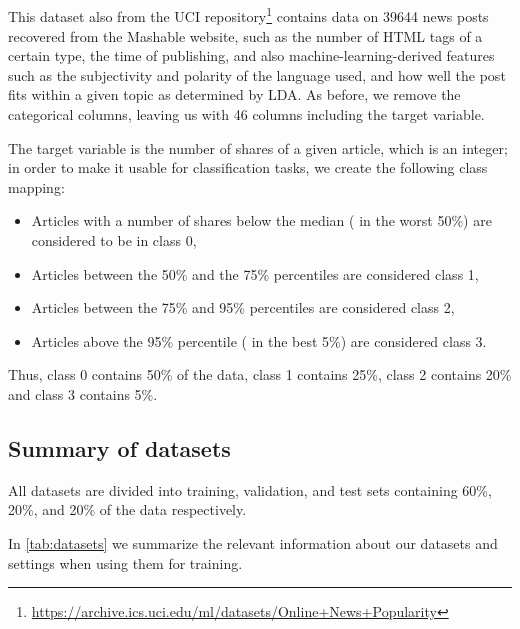 \documentclass[../main.tex]{subfiles}
\begin{document}
\subsection{\OnlineNewsPopularity}

This dataset \cite{fernandesProactive2015} also from the UCI repository\footnote{\url{https://archive.ics.uci.edu/ml/datasets/Online+News+Popularity}} contains data on 39644 news posts recovered from the Mashable website, such as the number of HTML tags of a certain type, the time of publishing, and also machine-learning-derived features such as the subjectivity and polarity of the language used, and how well the post fits within a given topic as determined by LDA.
As before, we remove the categorical columns, leaving us with 46 columns including the target variable.

The target variable is the number of shares of a given article, which is an integer; in order to make it usable for classification tasks, we create the following class mapping:
\begin{itemize}
    \item Articles with a number of shares below the median (\ie{} in the worst 50\%) are considered to be in class 0,
    \item Articles between the 50\% and the 75\% percentiles are considered class 1,
    \item Articles between the 75\% and 95\% percentiles are considered class 2,
\item Articles above the 95\% percentile (\ie{} in the best 5\%) are considered class 3.
\end{itemize}
Thus, class 0 contains 50\% of the data, class 1 contains 25\%, class 2 contains 20\% and class 3 contains 5\%.

\subsection{Summary of datasets}

All datasets are divided into training, validation, and test sets containing 60\%, 20\%, and 20\% of the data respectively.

In \autoref{tab:datasets} we summarize the relevant information about our datasets and settings when using them for training.
\end{document}
